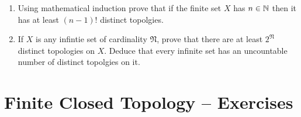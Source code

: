 \documentclass[10pt,a4paper]{report}
\begin{document}
\begin{enumerate}
\begin{enumerate}[label=(\roman*)]
	\item Using mathematical induction prove that if the finite set $X$ has $n \in \mathbb{N}$ then it has at least $(n-1)!$ distinct topolgies.\\
	
	\item If $X$ is any infintie set of cardinality $\mathfrak{N}$, prove that there are at least $2^\mathfrak{N}$ distinct topologies on $X$.  Deduce that every infinite set has an uncountable number of distinct topolgies on it.
\end{enumerate}
\end{enumerate}

\newpage
\section{Finite Closed Topology -- Exercises}
\end{document}
